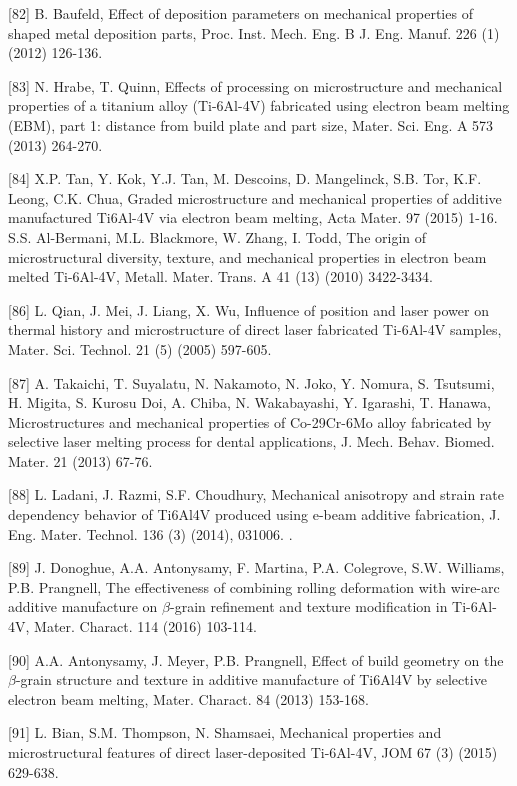 \documentclass[10pt]{article}
\begin{document}
[82] B. Baufeld, Effect of deposition parameters on mechanical properties of shaped metal deposition parts, Proc. Inst. Mech. Eng. B J. Eng. Manuf. 226 (1) (2012) 126-136.

[83] N. Hrabe, T. Quinn, Effects of processing on microstructure and mechanical properties of a titanium alloy (Ti-6Al-4V) fabricated using electron beam melting (EBM), part 1: distance from build plate and part size, Mater. Sci. Eng. A 573 (2013) 264-270.

[84] X.P. Tan, Y. Kok, Y.J. Tan, M. Descoins, D. Mangelinck, S.B. Tor, K.F. Leong, C.K. Chua, Graded microstructure and mechanical properties of additive manufactured Ti6Al-4V via electron beam melting, Acta Mater. 97 (2015) 1-16.\\
[85] S.S. Al-Bermani, M.L. Blackmore, W. Zhang, I. Todd, The origin of microstructural diversity, texture, and mechanical properties in electron beam melted Ti-6Al-4V, Metall. Mater. Trans. A 41 (13) (2010) 3422-3434.

[86] L. Qian, J. Mei, J. Liang, X. Wu, Influence of position and laser power on thermal history and microstructure of direct laser fabricated Ti-6Al-4V samples, Mater. Sci. Technol. 21 (5) (2005) 597-605.

[87] A. Takaichi, T. Suyalatu, N. Nakamoto, N. Joko, Y. Nomura, S. Tsutsumi, H. Migita, S. Kurosu Doi, A. Chiba, N. Wakabayashi, Y. Igarashi, T. Hanawa, Microstructures and mechanical properties of Co-29Cr-6Mo alloy fabricated by selective laser melting process for dental applications, J. Mech. Behav. Biomed. Mater. 21 (2013) 67-76.

[88] L. Ladani, J. Razmi, S.F. Choudhury, Mechanical anisotropy and strain rate dependency behavior of Ti6Al4V produced using e-beam additive fabrication, J. Eng. Mater. Technol. 136 (3) (2014), 031006. .

[89] J. Donoghue, A.A. Antonysamy, F. Martina, P.A. Colegrove, S.W. Williams, P.B. Prangnell, The effectiveness of combining rolling deformation with wire-arc additive manufacture on $\beta$-grain refinement and texture modification in Ti-6Al-4V, Mater. Charact. 114 (2016) 103-114.

[90] A.A. Antonysamy, J. Meyer, P.B. Prangnell, Effect of build geometry on the $\beta$-grain structure and texture in additive manufacture of Ti6Al4V by selective electron beam melting, Mater. Charact. 84 (2013) 153-168.

[91] L. Bian, S.M. Thompson, N. Shamsaei, Mechanical properties and microstructural features of direct laser-deposited Ti-6Al-4V, JOM 67 (3) (2015) 629-638.
\end{document}
